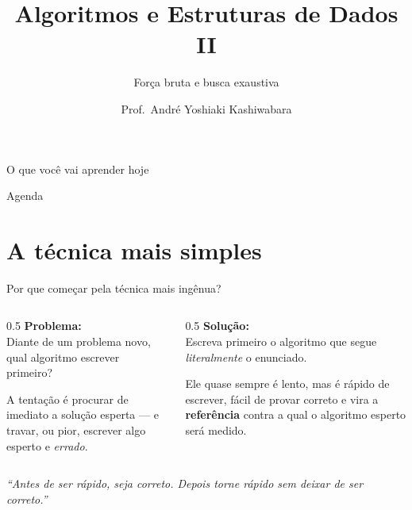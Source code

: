 \documentclass[aspectratio=169]{beamer}
\title{Algoritmos e Estruturas de Dados II}
\subtitle{Força bruta e busca exaustiva}
\author{Prof.\ André Yoshiaki Kashiwabara}
\institute{DCOMP -- Universidade Federal de Sergipe\\
\texttt{andreyoshiaki@dcomp.ufs.br}}
\date{}
\begin{document}
\begin{frame}[plain]
  \titlepage
\end{frame}

\begin{frame}{O que você vai aprender hoje}
  \begin{center}
  \end{center}
\end{frame}

\begin{frame}{Agenda}
  \tableofcontents
\end{frame}

\section{A técnica mais simples}

\begin{frame}{Por que começar pela técnica mais ingênua?}
  \begin{columns}[T]
    \begin{column}{0.5\textwidth}
      \textbf{Problema:}\\[2pt]
      Diante de um problema novo, qual algoritmo escrever primeiro?

      \medskip
      A tentação é procurar de imediato a solução esperta --- e travar, ou pior,
      escrever algo esperto e \emph{errado}.
    \end{column}
    \begin{column}{0.5\textwidth}
      \textbf{Solução:}\\[2pt]
      Escreva primeiro o algoritmo que segue \emph{literalmente} o enunciado.

      \medskip
      Ele quase sempre é lento, mas é rápido de escrever, fácil de provar correto
      e vira a \textbf{referência} contra a qual o algoritmo esperto será medido.
    \end{column}
  \end{columns}
  \vfill
  \begin{center}
    \small\itshape ``Antes de ser rápido, seja correto. Depois torne rápido sem deixar de ser correto.''
  \end{center}
\end{frame}
\end{document}

